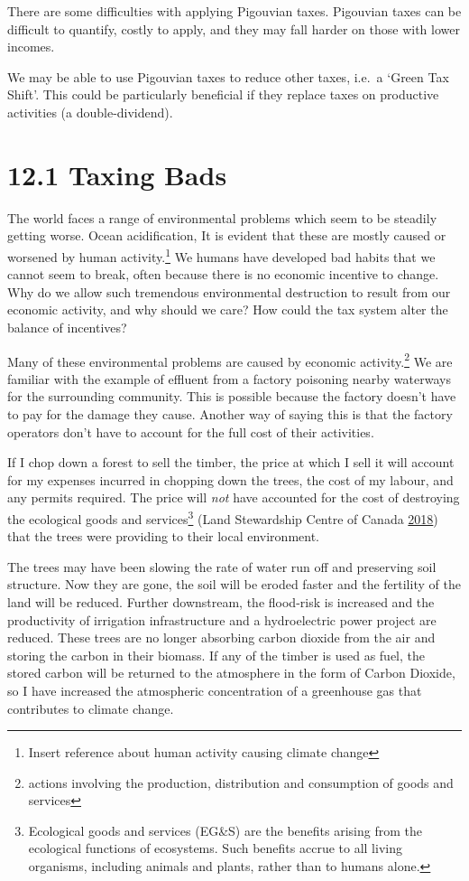 \documentclass[]{tufte-handout}
\begin{document}
There are some difficulties with applying Pigouvian taxes. Pigouvian
taxes can be difficult to quantify, costly to apply, and they may fall
harder on those with lower incomes.

We may be able to use Pigouvian taxes to reduce other taxes, i.e.~a
`Green Tax Shift'. This could be particularly beneficial if they replace
taxes on productive activities (a double-dividend).

\hypertarget{taxing-bads}{%
\section{12.1 Taxing Bads}\label{taxing-bads}}

The world faces a range of environmental problems which seem to be
steadily getting worse. Ocean acidification, It is evident that these
are mostly caused or worsened by human activity.\footnote{Insert
  reference about human activity causing climate change} We humans have
developed bad habits that we cannot seem to break, often because there
is no economic incentive to change. Why do we allow such tremendous
environmental destruction to result from our economic activity, and why
should we care? How could the tax system alter the balance of
incentives?

Many of these environmental problems are caused by economic
activity.\footnote{actions involving the production, distribution and
  consumption of goods and services} We are familiar with the example of
effluent from a factory poisoning nearby waterways for the surrounding
community. This is possible because the factory doesn't have to pay for
the damage they cause. Another way of saying this is that the factory
operators don't have to account for the full cost of their activities.

If I chop down a forest to sell the timber, the price at which I sell it
will account for my expenses incurred in chopping down the trees, the
cost of my labour, and any permits required. The price will \emph{not}
have accounted for the cost of destroying the ecological goods and
services\footnote{Ecological goods and services (EG\&S) are the benefits
  arising from the ecological functions of ecosystems. Such benefits
  accrue to all living organisms, including animals and plants, rather
  than to humans alone.} (Land Stewardship Centre of Canada
\protect\hyperlink{ref-LandStewardshipCentreofCanada2018}{2018}) that
the trees were providing to their local environment.

The trees may have been slowing the rate of water run off and preserving
soil structure. Now they are gone, the soil will be eroded faster and
the fertility of the land will be reduced. Further downstream, the
flood-risk is increased and the productivity of irrigation
infrastructure and a hydroelectric power project are reduced. These
trees are no longer absorbing carbon dioxide from the air and storing
the carbon in their biomass. If any of the timber is used as fuel, the
stored carbon will be returned to the atmosphere in the form of Carbon
Dioxide, so I have increased the atmospheric concentration of a
greenhouse gas that contributes to climate change.
\end{document}

